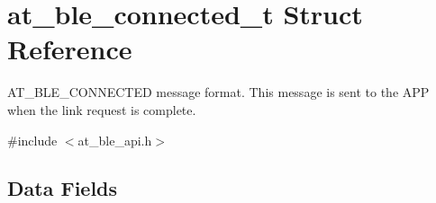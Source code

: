 \hypertarget{structat__ble__connected__t}{}\section{at\+\_\+ble\+\_\+connected\+\_\+t Struct Reference}
\label{structat__ble__connected__t}


A\+T\+\_\+\+B\+L\+E\+\_\+\+C\+O\+N\+N\+E\+C\+T\+ED message format. This message is sent to the A\+PP when the link request is complete.  




{\ttfamily \#include $<$at\+\_\+ble\+\_\+api.\+h$>$}

\subsection*{Data Fields}
